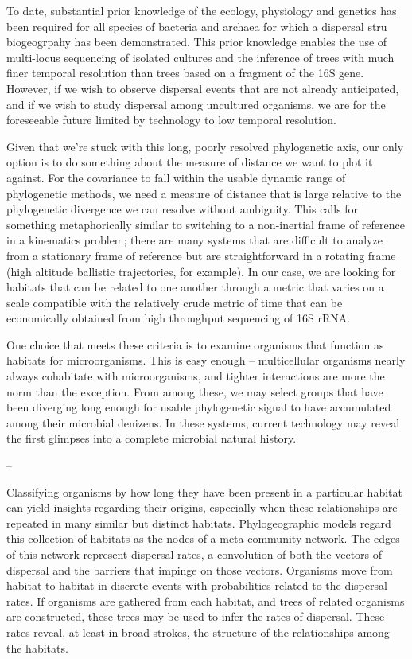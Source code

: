 To date, substantial prior knowledge of the ecology, physiology and genetics has been required for all species of bacteria and archaea for which a dispersal stru biogeogrpahy has been demonstrated. This prior knowledge enables the use of multi-locus sequencing of isolated cultures and the inference of trees with much finer temporal resolution than trees based on a fragment of the 16S gene. However, if we wish to observe dispersal events that are not already anticipated, and if we wish to study dispersal among uncultured organisms, we are for the foreseeable future limited by technology to low temporal resolution.

Given that we're stuck with this long, poorly resolved phylogenetic axis, our only option is to do something about the measure of distance we want to plot it against. For the covariance to fall within the usable dynamic range of phylogenetic methods, we need a measure of distance that is large relative to the phylogenetic divergence we can resolve without ambiguity. This calls for something metaphorically similar to switching to a non-inertial frame of reference in a kinematics problem; there are many systems that are difficult to analyze from a stationary frame of reference but are straightforward in a rotating frame (high altitude ballistic trajectories, for example). In our case, we are looking for habitats that can be related to one another through a metric that varies on a scale compatible with the relatively crude metric of time that can be economically obtained from high throughput sequencing of 16S rRNA.

One choice that meets these criteria is to examine organisms that function as habitats for microorganisms. This is easy enough -- multicellular organisms nearly always cohabitate with microorganisms, and tighter interactions are more the norm than the exception. From among these, we may select groups that have been diverging long enough for usable phylogenetic signal to have accumulated among their microbial denizens. In these systems, current technology may reveal the first glimpses into a complete microbial natural history.

--

Classifying organisms by how long they have been present in a particular habitat can yield insights regarding their origins, especially when these relationships are repeated in many similar but distinct habitats. Phylogeographic models regard this collection of habitats as the nodes of a meta-community network. The edges of this network represent dispersal rates, a convolution of both the vectors of dispersal and the barriers that impinge on those vectors. Organisms move from habitat to habitat in discrete events with probabilities related to the dispersal rates. If organisms are gathered from each habitat, and trees of related organisms are constructed, these trees may be used to infer the rates of dispersal. These rates reveal, at least in broad strokes, the structure of the relationships among the habitats.

